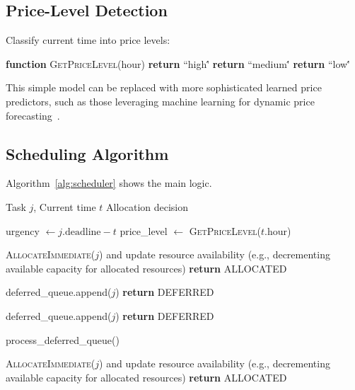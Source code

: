\documentclass[10pt,conference]{IEEEtran}
\begin{document}
\subsection{Price-Level Detection}

Classify current time into price levels:
\begin{algorithmic}[1]
\State \textbf{function} \textsc{GetPriceLevel}(hour)
    \State \textbf{return} ``high\''
    \State \textbf{return} ``medium\''
\Else
    \State \textbf{return} ``low\''
\EndIf
\end{algorithmic}

This simple model can be replaced with more sophisticated learned price predictors, such as those leveraging machine learning for dynamic price forecasting~\cite{dangana2025ksurf}.

\subsection{Scheduling Algorithm}

Algorithm~\ref{alg:scheduler} shows the main logic.

\begin{algorithm}[t]
\caption{Time-Arbitrage Scheduler}
\label{alg:scheduler}
\begin{algorithmic}[1]
\Require Task $j$, Current time $t$
\Ensure Allocation decision

\State urgency $\gets j.\text{deadline} - t$
\State price\_level $\gets$ \textsc{GetPriceLevel}($t.\text{hour}$)

\State {}
    \State \textsc{AllocateImmediate}($j$) and update resource availability (e.g., decrementing available capacity for allocated resources)
    \State \textbf{return} ALLOCATED
\EndIf

\State {}
    \State deferred\_queue.append($j$)
    \State \textbf{return} DEFERRED
\EndIf

\State {}
\State deferred\_queue.append($j$)
    \State \textbf{return} DEFERRED
\EndIf

\State {}
    \State process\_deferred\_queue()
\EndIf

\State {}
\State \textsc{AllocateImmediate}($j$) and update resource availability (e.g., decrementing available capacity for allocated resources)
\State \textbf{return} ALLOCATED
\end{algorithmic}
\end{algorithm}
\end{document}
